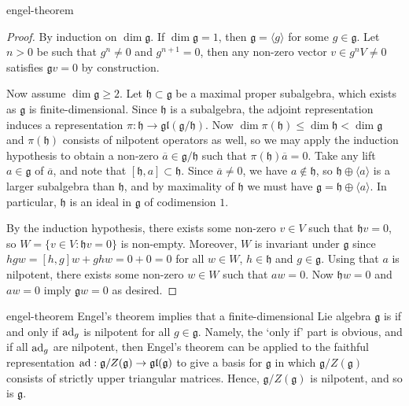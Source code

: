 \begin{example}{engel-theorem}
    \begin{proof}
        By induction on $\dim \mathfrak{g}$. If $\dim \mathfrak{g} = 1$, then $\mathfrak{g} = \langle g \rangle$ for some $g \in \mathfrak{g}$. Let $n > 0$ be such that $g^n \ne 0$ and $g^{n + 1} = 0$, then any non-zero vector $v \in g^n V \ne 0$ satisfies $\mathfrak{g} v = 0$ by construction.
    
        Now assume $\dim \mathfrak{g} \ge 2$. Let $\mathfrak{h} \subset \mathfrak{g}$ be a maximal proper subalgebra, which exists as $\mathfrak{g}$ is finite-dimensional. Since $\mathfrak{h}$ is a subalgebra, the adjoint representation induces a representation $\pi : \mathfrak{h} \to \mathfrak{gl}(\mathfrak{g}/\mathfrak{h})$. Now $\dim \pi(\mathfrak{h}) \le \dim \mathfrak{h} < \dim \mathfrak{g}$ and $\pi(\mathfrak{h})$ consists of nilpotent operators as well, so we may apply the induction hypothesis to obtain a non-zero $\overline{a} \in \mathfrak{g}/\mathfrak{h}$ such that $\pi(\mathfrak{h}) \overline{a} = 0$. Take any lift $a \in \mathfrak{g}$ of $\overline{a}$, and note that $[\mathfrak{h}, a] \subset \mathfrak{h}$. Since $\overline{a} \ne 0$, we have $a \not\in \mathfrak{h}$, so $\mathfrak{h} \oplus \langle a \rangle$ is a larger subalgebra than $\mathfrak{h}$, and by maximality of $\mathfrak{h}$ we must have $\mathfrak{g} = \mathfrak{h} \oplus \langle a \rangle$. In particular, $\mathfrak{h}$ is an ideal in $\mathfrak{g}$ of codimension $1$.
        
        By the induction hypothesis, there exists some non-zero $v \in V$ such that $\mathfrak{h} v = 0$, so $W = \{ v \in V : \mathfrak{h} v = 0 \}$ is non-empty. Moreover, $W$ is invariant under $\mathfrak{g}$ since $hgw = [h, g]w + ghw = 0 + 0 = 0$ for all $w \in W$, $h \in \mathfrak{h}$ and $g \in \mathfrak{g}$. Using that $a$ is nilpotent, there exists some non-zero $w \in W$ such that $aw = 0$. Now $\mathfrak{h} w = 0$ and $aw = 0$ imply $\mathfrak{g} w = 0$ as desired.
    \end{proof}
\end{example}

\begin{example}{engel-theorem}
    Engel's theorem implies that a finite-dimensional Lie algebra $\mathfrak{g}$ is  if and only if $\textup{ad}_g$ is nilpotent for all $g \in \mathfrak{g}$. Namely, the `only if' part is obvious, and if all $\textup{ad}_g$ are nilpotent, then Engel's theorem can be applied to the faithful representation $\textup{ad} : \mathfrak{g}/Z(\mathfrak{g}) \to \mathfrak{gl}(\mathfrak{g})$ to give a basis for $\mathfrak{g}$ in which $\mathfrak{g}/Z(\mathfrak{g})$ consists of strictly upper triangular matrices. Hence, $\mathfrak{g}/Z(\mathfrak{g})$ is nilpotent, and so is $\mathfrak{g}$.
\end{example}

